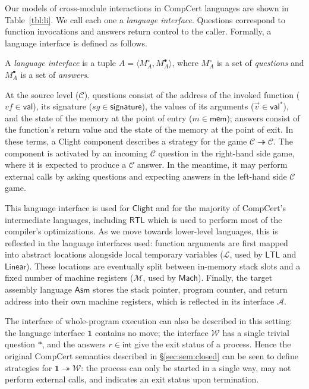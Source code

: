 \documentclass[sigplan,10pt,review,anonymous]{acmart}
\newcommand{\kw}[1]{\ensuremath{ \mathsf{#1} }}
\newcommand{\que}{\circ}
\newcommand{\ans}{\bullet}
\begin{document}
Our models of cross-module interactions in CompCert languages
are shown in Table~\ref{tbl:li}.
We call each one a \emph{language interface}.
Questions correspond to function invocations
and answers return control to the caller.
Formally,
a language interface is defined as follows.

\begin{definition} \label{def:li}
A \emph{language interface} is a tuple
$A = \langle M_A^\que, M_A^\ans \rangle$, where
$M_A^\que$ is a set of \emph{questions} and
$M_A^\ans$ is a set of \emph{answers}.
\end{definition}

At the source level ($\mathcal{C}$),
questions consist of
the address of the invoked function
($\mathit{vf} \in \kw{val}$),
its signature
($\mathit{sg} \in \kw{signature}$),
the values of its arguments
($\vec{v} \in \kw{val}^*$),
and the state of the memory at the point of entry
($m \in \kw{mem}$);
answers
consist of the function's return value
and the state of the memory at the point of exit.
In these terms,
a Clight component describes a strategy for the game
$\mathcal{C} \twoheadrightarrow \mathcal{C}$.
The component is activated by an incoming $\mathcal{C}$ question
in the right-hand side game,
where it is expected to produce a $\mathcal{C}$ answer.
In the meantime,
it may perform external calls by
asking questions and expecting answers
in the left-hand side $\mathcal{C}$ game.

This language interface is used for \kw{Clight} and
for the majority of CompCert's intermediate languages,
including \kw{RTL} which is used to perform
most of the compiler's optimizations.
As we move towards lower-level languages,
this is reflected in the language interfaces used:
function arguments are first mapped into
abstract locations alongside local temporary variables
($\mathcal{L}$, used by \kw{LTL} and \kw{Linear}).
These locations are eventually split between
in-memory stack slots and a fixed number of machine registers
($\mathcal{M}$, used by \kw{Mach}).
Finally, the target assembly language \kw{Asm}
stores the stack pointer, program counter,
and return address into their own machine registers,
which is reflected in its interface $\mathcal{A}$.

The interface of whole-program execution
can also be described in this setting:
the language interface $\mathbf{1}$ contains no move;
the interface $\mathcal{W}$ has a single trivial question $*$,
and the answers $r \in \kw{int}$
give the exit status of a process.
Hence the original CompCert semantics described in
\S\ref{sec:sem:closed}
can be seen to define strategies for
$\mathbf{1} \twoheadrightarrow \mathcal{W}$:
the process can only be started in a single way,
may not perform external calls,
and indicates an exit status upon termination.
\end{document}
